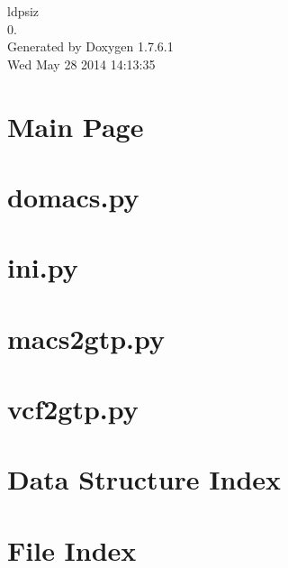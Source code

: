 \documentclass[letterpaper]{article}
\begin{document}
\hypersetup{pageanchor=false,citecolor=blue}
\begin{titlepage}
\vspace*{7cm}
\begin{center}
{\Large ldpsiz \\[1ex]\large 0. }\\
\vspace*{1cm}
{\large \-Generated by Doxygen 1.7.6.1}\\
\vspace*{0.5cm}
{\small Wed May 28 2014 14:13:35}\\
\end{center}
\end{titlepage}
\tableofcontents
{}
\hypersetup{pageanchor=true,citecolor=blue}
\section{\-Main \-Page}
\label{index}\hypertarget{index}{}
\section{domacs.\-py}
\label{domacs.py}
\hypertarget{domacs.py}{}

\section{ini.\-py}
\label{ini.py}
\hypertarget{ini.py}{}

\section{macs2gtp.\-py}
\label{macs2gtp.py}
\hypertarget{macs2gtp.py}{}

\section{vcf2gtp.\-py}
\label{vcf2gtp.py}
\hypertarget{vcf2gtp.py}{}

\section{\-Data \-Structure \-Index}

\section{\-File \-Index}

\end{document}
